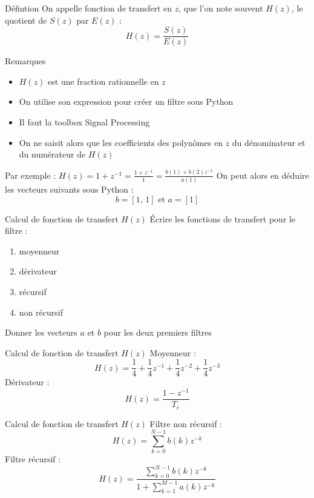 \documentclass{beamer}
\begin{document}
\begin{frame}
\begin{block}{Défintion}
\justify On appelle fonction de transfert en $z$, que l'on note souvent $H(z)$,
le quotient de $S(z)$ par $E(z)$ :
$$
H(z) = \frac{S(z)}{E(z)}
$$ 
\end{block}
\pause
\begin{block}{Remarques}
\begin{itemize}
  \item $H(z)$ est une fraction rationnelle en $z$
  \item On utilise son expression pour créer un filtre sous Python
  \item Il faut la toolbox Signal Processing
  \item On ne saisit alors que les coefficients des polynômes en $z$ du
  dénominateur et du numérateur de $H(z)$
\end{itemize}
\end{block}
\end{frame}

\begin{frame}
\justify Par exemple :
$
H(z) = 1+z^{-1} = \frac{1+z^{-1}}{1} = \frac{b(1) + b(2)z^{-1}}{a(1)}
$
\justify On peut alors en déduire les vecteurs suivants sous Python :
$$
b = [1\text{, }1]\text{ et }a = [1]
$$
\begin{exampleblock}{Calcul de fonction de transfert $H(z)$}
\justify Écrire les fonctions de transfert pour le filtre :
\begin{enumerate}
  \item moyenneur
  \item dérivateur
  \item récursif
  \item non récursif
\end{enumerate}
\justify Donner les vecteurs $a$ et $b$ pour les deux premiers filtres
\end{exampleblock}
\end{frame}

\begin{frame}
\begin{exampleblock}{Calcul de fonction de transfert $H(z)$}
Moyenneur :
$$
H(z) = \frac{1}{4}+\frac{1}{4}z^{-1}+\frac{1}{4}z^{-2}+\frac{1}{4}z^{-3}
$$
\pause
Dérivateur :
$$
H(z) = \frac{1-z^{-1}}{T_e}
$$
\end{exampleblock}
\end{frame}

\begin{frame}
\begin{exampleblock}{Calcul de fonction de transfert $H(z)$}
Filtre non récursif :
$$
H(z) = \sum_{k=0}^{N-1}b(k)z^{-k}
$$
\pause
Filtre récursif :
$$
H(z) = \frac{\sum_{k=0}^{N-1}b(k)z^{-k}}{1+\sum_{k=1}^{M-1}a(k)z^{-k}}
$$
\end{exampleblock}
\end{frame}
\end{document}
